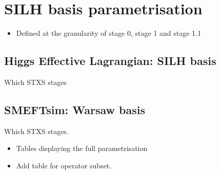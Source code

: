 \chapter{SILH basis parametrisation}\label{app:hel_parametrisation}

\begin{itemize}
    \item Defined at the granularity of stage 0, stage 1 and stage 1.1
\end{itemize}
\section{Higgs Effective Lagrangian: SILH basis}
Which STXS stages


\section{SMEFTsim: Warsaw basis}
Which STXS stages.

\begin{itemize}
    \item Tables displaying the full parametrisation
    \item Add table for operator subset.
\end{itemize}